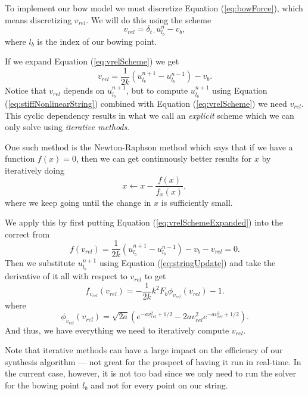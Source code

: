\documentclass{article}
\begin{document}
To implement our bow model we must discretize Equation (\ref{eq:bowForce}), which means discretizing $v_{rel}$.
We will do this using the scheme
\begin{equation}
  \label{eq:vrelScheme}
  v_{rel} = \delta_{t\cdot} u^n_{l_b} - v_b,
\end{equation}
where $l_b$ is the index of our bowing point.

If we expand Equation (\ref{eq:vrelScheme}) we get
\begin{equation}
  \label{eq:vrelSchemeExpanded}
  v_{rel} = \frac{1}{2k}\left(u^{n+1}_{l_b} - u^{n-1}_{l_b}\right) - v_b.
\end{equation}
Notice that $v_{rel}$ depends on $u^{n+1}_{l_b}$, but to compute $u^{n+1}_{l_b}$ using Equation (\ref{eq:stiffNonlinearString}) combined with Equation (\ref{eq:vrelScheme}) we need $v_{rel}$.
This cyclic dependency results in what we call an \textit{explicit} scheme which we can only solve using \textit{iterative methods}.

One such method is the Newton-Raphson method which says that if we have a function $f(x) = 0$, then we can get continuously better results for $x$ by iteratively doing
\begin{equation}
  x \leftarrow x - \frac{f(x)}{f_x(x)},
\end{equation}
where we keep going until the change in $x$ is sufficiently small.

We apply this by first putting Equation (\ref{eq:vrelSchemeExpanded}) into the correct from
\begin{equation}
  f(v_{rel}) = \frac{1}{2k} \left(u^{n+1}_{l_b} - u^{n-1}_{l_b} \right) - v_b - v_{rel} = 0.
\end{equation}
Then we substitute $u^{n+1}_{l_b}$ using Equation (\ref{eq:stringUpdate}) and take the derivative of it all with respect to $v_{rel}$ to get
\begin{equation}
  f_{v_{rel}}(v_{rel}) = - \frac{1}{2k} k^2 F_b \phi_{v_{rel}}(v_{rel}) - 1.
\end{equation}
where
\begin{equation}
  \phi_{v_{rel}}(v_{rel}) = \sqrt{2 a} \left(e^{-a v_{rel}^2 + 1/2} - 2 a v_{rel}^2 e^{-a v_{rel}^2 + 1/2} \right).
\end{equation}
And thus, we have everything we need to iteratively compute $v_{rel}$.

Note that iterative methods can have a large impact on the efficiency of our synthesis algorithm --- not great for the prospect of having it run in real-time.
In the current case, however, it is not too bad since we only need to run the solver for the bowing point $l_b$ and not for every point on our string.
\end{document}
